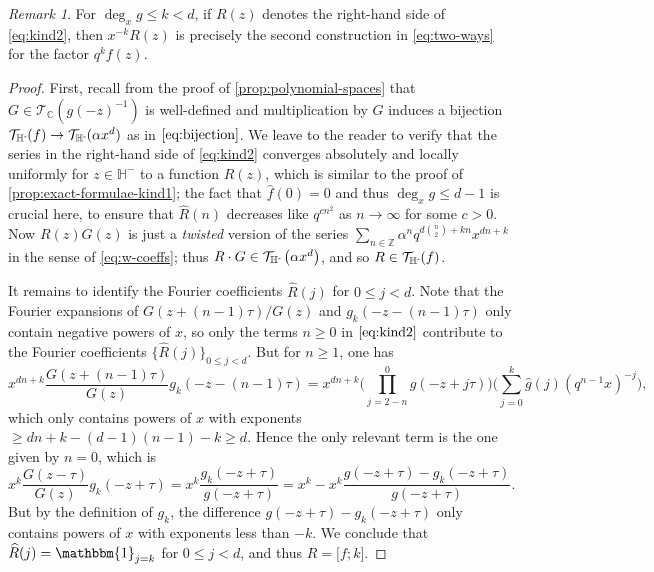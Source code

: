 \documentclass[reqno,11pt]{amsart}
\theoremstyle{definition}
\theoremstyle{remark}
\newtheorem*{remark}{Remark}
\numberwithin{equation}{section}
\newcommand{\Z}{\mathbb{Z}}
\newcommand{\C}{\mathbb{C}}
\renewcommand{\H}{{\mathbb{H}}}
\newcommand{\Hminus}{{\mathbb{H}^{\textnormal{-}\hspace{-0.03cm}}}}
\newcommand{\mT}{\mathcal{T}}
\newcommand{\one}{\mathbbm{1}}
\newcommand{\vect}[2]{\big[{#1};{#2}\big]}
\renewcommand{\hat}{\widehat}
\begin{document}
\begin{remark}
For $\deg_x g \le k < d$, if $R(z)$ denotes the right-hand side of \cref{eq:kind2}, then $x^{-k} R(z)$ is precisely the second construction in \cref{eq:two-ways} for the factor $q^k f(z)$.
\end{remark}
\begin{proof}
First, recall from the proof of \cref{prop:polynomial-spaces} that $G \in \mT_\C\left(g(-z)^{-1}\right)$ is well-defined and multiplication by $G$ induces a bijection $\mT_\Hminus(f) \to \mT_\Hminus(\alpha x^d)$ as in $\cref{eq:bijection}$.
We leave to the reader to verify that the series in the right-hand side of \cref{eq:kind2} converges absolutely and locally uniformly for $z \in \H^-$ to a function $R(z)$, which is similar to the proof of \cref{prop:exact-formulae-kind1}; the fact that $\hat{f}(0) = 0$ and thus $\deg_x g \le d-1$ is crucial here, to ensure that $\hat{R}(n)$ decreases like $q^{cn^2}$ as $n \to \infty$ for some $c > 0$. Now $R(z)G(z)$ is just a \emph{twisted} version of the series $\sum_{n \in \Z} \alpha^n q^{d\binom{n}{2}+kn} x^{dn+k}$ in the sense of \cref{eq:w-coeffs}; thus $R \cdot G \in \mT_\Hminus\left(\alpha x^d\right)$, and so $R \in \mT_\Hminus (f)$. 

It remains to identify the Fourier coefficients $\hat{R}(j)$ for $0 \le j < d$. Note that the Fourier expansions of $G(z + (n-1)\tau)/G(z)$ and $g_k(-z-(n-1)\tau)$ only contain negative powers of $x$, so only the terms $n \ge 0$ in $\cref{eq:kind2}$ contribute to the Fourier coefficients $\{\hat{R}(j)\}_{0 \le j < d}$. But for $n \ge 1$, one has
\[
    x^{dn+k}
    \frac{G\left(z+(n-1)\tau\right)}{G(z)} g_k\left(-z-(n-1)\tau\right)
    =
    x^{dn+k}
    \Bigg(\prod_{j=2-n}^0 g(-z+j\tau)\Bigg)
    \Bigg( \sum_{j=0}^k \hat{g}(j) \left(q^{n-1} x\right)^{-j}\Bigg),
\]
which only contains powers of $x$ with exponents $\ge dn+k - (d-1)(n-1) - k \ge d$. Hence the only relevant term is the one given by $n = 0$, which is
\[
    x^k \frac{G(z-\tau)}{G(z)} g_k(-z+\tau)
    =
    x^k \frac{g_k(-z+\tau)}{g(-z+\tau)}
    =
    x^k - x^k\frac{g(-z+\tau) - g_k(-z+\tau)}{g(-z+\tau)}.
\] 
But by the definition of $g_k$, the difference $g(-z+\tau) - g_k(-z+\tau)$ only contains powers of $x$ with exponents less than $-k$. We conclude that $\hat{R}(j) = \one_{j=k}$ for $0 \le j < d$, and thus $R = \vect{f}{k}$.
\end{proof}
\end{document}
